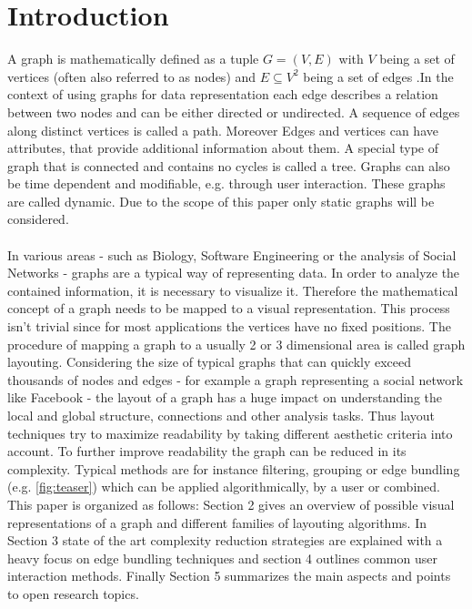 \section{Introduction}
A graph is mathematically defined as a tuple $ G = (V, E)$ with $V$ being a set of vertices (often also referred to as nodes) and $E \subseteq V^2$ being a set of edges \cite{Al-Taie2017}.In the context of using graphs for data representation each edge describes a relation between two nodes and can be either directed or undirected. A sequence of edges along distinct vertices is called a path. Moreover Edges and vertices can have attributes, that provide additional information about them. A special type of graph that is connected and contains no cycles is called a tree. Graphs can also be time dependent and modifiable, e.g. through user interaction. These graphs are called dynamic. Due to the scope of this paper only static graphs will be considered.\\
\\
In various areas - such as Biology, Software Engineering or the analysis of Social Networks - graphs are a typical way of representing data. In order to analyze the contained information, it is necessary to visualize it. Therefore the mathematical concept of a graph needs to be mapped to a visual representation. This process isn't trivial since for most applications the vertices have no fixed positions.
The procedure of mapping a graph to a usually 2 or 3 dimensional area is called graph layouting. 
Considering the size of typical graphs that can quickly exceed thousands of nodes and edges - for example a graph representing a social network like Facebook -  the layout of a graph has a huge impact on understanding the local and global structure, connections and other analysis tasks. Thus layout techniques try to maximize readability by taking different aesthetic criteria into account. To further improve readability the graph can be reduced in its complexity. Typical methods are for instance filtering, grouping or edge bundling (e.g. \autoref{fig:teaser}) which can be applied algorithmically, by a user or combined. \\ This paper is organized as follows: Section 2 gives an overview of possible visual representations of a graph and different families of layouting algorithms. In Section 3 state of the art complexity reduction strategies are explained with a heavy focus on edge bundling techniques and section 4 outlines common user interaction methods. Finally Section 5 summarizes the main aspects and points to open research topics.
